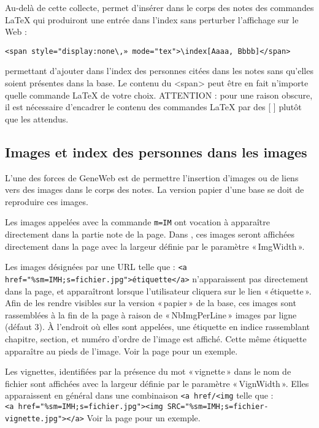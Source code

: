 Au-delà de cette collecte, \gwtol{} permet d'insérer dans le corps des notes
des commandes \LaTeX{} qui produiront une entrée dans l'index sans perturber
l'affichage sur le Web :
\begin{verbatim}
<span style="display:none\,» mode="tex">\index[Aaaa, Bbbb]</span>
\end{verbatim}
permettant d'ajouter dans l'index des personnes citées dans les notes
sans qu'elles soient présentes dans la base.
Le contenu du <span> peut être en fait n'importe quelle commande LaTeX de votre choix.
ATTENTION : pour une raison obscure, il est nécessaire d'encadrer le
contenu des commandes \LaTeX{} par des [ ] plutôt que les { } attendus.

\subsection{Images et index des personnes dans les images}

L'une des forces de GeneWeb est de permettre l'insertion d'images ou de
liens vers des images dans le corps des notes. La version papier d'une base
se doit de reproduire ces images.

Les images appelées avec la commande \verb|m=IM| ont vocation à apparaître
directement dans la partie note de la page. Dans \gwtol{}, ces images seront
affichées directement dans la page avec la largeur définie par
le paramètre «\,ImgWidth\,».

Les images désignées par une URL telle que :
\verb|<a href="%sm=IMH;s=fichier.jpg">étiquette</a>| n'apparaissent pas
directement dans la page, et apparaîtront lorsque l'utilisateur cliquera
sur le lien «\,étiquette\,». Afin de les rendre visibles sur la
version «\,papier\,» de la base, ces images sont rassemblées à la fin
de la page à raison de «\,NbImgPerLine\,» images par ligne (défaut 3).
À l'endroit où elles sont appelées, une étiquette en indice rassemblant
chapitre, section, et numéro d'ordre de l'image est affiché. Cette même 
étiquette apparaître au pieds de l'image.
Voir la page \pageref{leondupont} pour un exemple.

Les vignettes, identifiées par la présence du mot «\,vignette\,» dans
le nom de fichier sont affichées avec la largeur définie par le paramètre
«\,VignWidth\,». Elles apparaissent en général dans une combinaison
\verb|<a href/<img| telle que : \\
\verb|<a href="%sm=IMH;s=fichier.jpg"><img SRC="%sm=IMH;s=fichier-vignette.jpg"></a>|
Voir la page \pageref{leondupont} pour un exemple.

